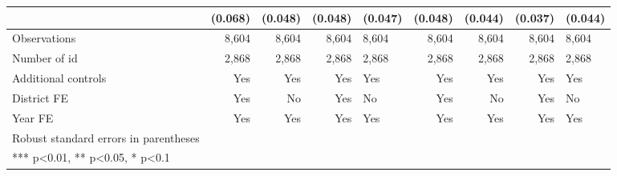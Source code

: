 \documentclass[
]{article}
\begin{document}
\begin{landscape}
\begin{longtable}[t]{lrrrlrrrl}
 & (0.068) & (0.048) & (0.048) & (0.047) & (0.048) & (0.044) & (0.037) & (0.044)\\
\midrule
Observations & 8,604 & 8,604 & 8,604 & 8,604 & 8,604 & 8,604 & 8,604 & 8,604\\
\addlinespace
Number of id & 2,868 & 2,868 & 2,868 & 2,868 & 2,868 & 2,868 & 2,868 & 2,868\\
Additional controls & Yes & Yes & Yes & Yes & Yes & Yes & Yes & Yes\\
District FE & Yes & No & Yes & No & Yes & No & Yes & No\\
Year FE & Yes & Yes & Yes & Yes & Yes & Yes & Yes & Yes\\
\midrule
Robust standard errors in parentheses &  &  &  &  &  &  &  & \\
\addlinespace
*** p<0.01, ** p<0.05, * p<0.1 &  &  &  &  &  &  &  & \\*
\end{longtable}
\end{landscape}
\endgroup{}

\newpage

\begingroup\fontsize{7}{9}\selectfont
\end{document}
